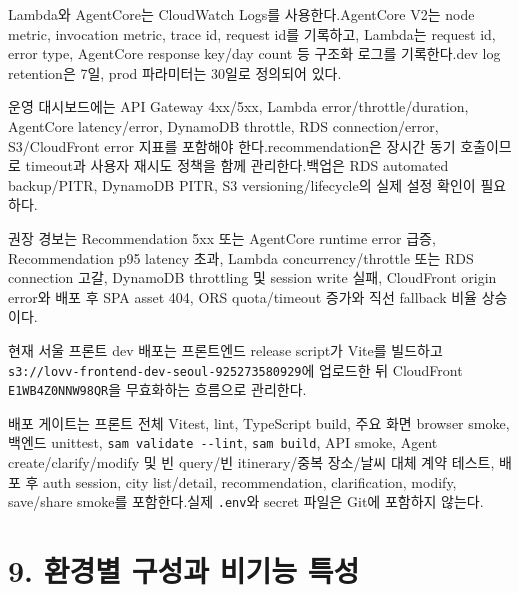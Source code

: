 \documentclass[12pt,a4paper]{article}
\newcommand{\DocNeedspace}[1]{\par\ifdim\dimexpr\pagegoal-\pagetotal\relax<#1\newpage\fi}
\newcommand{\TocNoChildTight}{\vspace{-0.28em}}
\begin{document}
\DocNeedspace{3\baselineskip}
Lambda와 AgentCore는 CloudWatch Logs를 사용한다.\newline AgentCore V2는 node metric, invocation metric, trace id, request id를 기록하고, Lambda는 request id, error type, AgentCore response key/day count 등 구조화 로그를 기록한다.\newline dev log retention은 7일, prod 파라미터는 30일로 정의되어 있다.


\DocNeedspace{3\baselineskip}
운영 대시보드에는 API Gateway 4xx/5xx, Lambda error/throttle/duration, AgentCore latency/error, DynamoDB throttle, RDS connection/error, S3/CloudFront error 지표를 포함해야 한다.\newline recommendation은 장시간 동기 호출이므로 timeout과 사용자 재시도 정책을 함께 관리한다.\newline 백업은 RDS automated backup/PITR, DynamoDB PITR, S3 versioning/lifecycle의 실제 설정 확인이 필요하다.


\DocNeedspace{3\baselineskip}
권장 경보는 Recommendation 5xx 또는 AgentCore runtime error 급증, Recommendation p95 latency 초과, Lambda concurrency/throttle 또는 RDS connection 고갈, DynamoDB throttling 및 session write 실패, CloudFront origin error와 배포 후 SPA asset 404, ORS quota/timeout 증가와 직선 fallback 비율 상승이다.


\DocNeedspace{3\baselineskip}
현재 서울 프론트 dev 배포는 프론트엔드 release script가 Vite를 빌드하고 \texttt{s3:\allowbreak{}/\allowbreak{}/\allowbreak{}lovv-\allowbreak{}frontend-\allowbreak{}dev-\allowbreak{}seoul-\allowbreak{}925273580929}에 업로드한 뒤 CloudFront \texttt{E1\allowbreak{}WB4\allowbreak{}Z0\allowbreak{}NNW98\allowbreak{}QR}을 무효화하는 흐름으로 관리한다.


\DocNeedspace{3\baselineskip}
배포 게이트는 프론트 전체 Vitest, lint, TypeScript build, 주요 화면 browser smoke, 백엔드 unittest, \texttt{sam validate -\allowbreak{}-\allowbreak{}lint}, \texttt{sam build}, API smoke, Agent create/clarify/modify 및 빈 query/빈 itinerary/중복 장소/날씨 대체 계약 테스트, 배포 후 auth session, city list/detail, recommendation, clarification, modify, save/share smoke를 포함한다.\newline 실제 \texttt{.\allowbreak{}env}와 secret 파일은 Git에 포함하지 않는다.


\newpage

\DocNeedspace{10\baselineskip}
\section*{9. 환경별 구성과 비기능 특성}
\addtocontents{toc}{\protect\TocNoChildTight}
\end{document}
